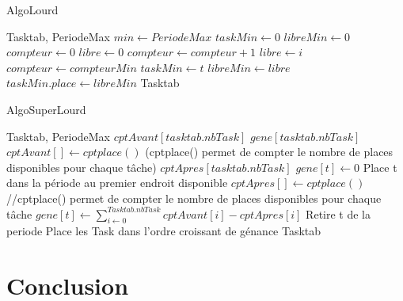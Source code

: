 \documentclass[11pt]{article}
\begin{document}
\begin{algorithm}
    \caption{AlgoLourd}
    \begin{algorithmic}
    \REQUIRE Tasktab, PeriodeMax
    \STATE $min \leftarrow PeriodeMax$
    \STATE $taskMin \leftarrow 0$
    \STATE $libreMin \leftarrow 0$
        \STATE $compteur \leftarrow 0$
        \STATE $libre \leftarrow 0$
                    \STATE $compteur \leftarrow compteur + 1$
                    \STATE $libre \leftarrow i$
                \ENDIF
            \ENDFOR
                \STATE $compteur \leftarrow compteurMin$
                \STATE $taskMin \leftarrow t$
                \STATE $libreMin \leftarrow libre$
            \ENDIF
        \ENDFOR
        \STATE $taskMin.place \leftarrow libreMin$
    \ENDFOR
    \RETURN Tasktab
    \end{algorithmic}
\end{algorithm}


\begin{algorithm}
    \caption{AlgoSuperLourd}
    \begin{algorithmic}
    \REQUIRE Tasktab, PeriodeMax
    \STATE $cptAvant[tasktab.nbTask]$
    \STATE $gene[tasktab.nbTask]$
        \STATE $cptAvant[] \leftarrow cptplace()$ (cptplace() permet de compter le nombre de places disponibles pour chaque tâche)
        \STATE $cptApres[tasktab.nbTask]$
            \STATE $gene[t] \leftarrow 0$
            \STATE Place t dans la période au premier endroit disponible
            \STATE $cptApres[] \leftarrow cptplace()$ //cptplace() permet de compter le nombre de places disponibles pour chaque tâche
            \STATE $gene[t] \leftarrow \sum\limits_{i\leftarrow0}^{Tasktab.nbTask} cptAvant[i] - cptApres[i]$
            \STATE Retire t de la periode
        \ENDFOR
        \STATE Place les Task dans l'ordre croissant de génance
    \ENDFOR
    \RETURN Tasktab
    \end{algorithmic}
\end{algorithm}

\newpage
\section{Conclusion}
\end{document}
